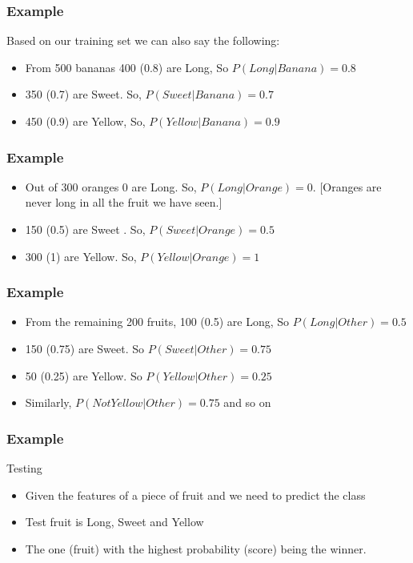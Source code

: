\begin{frame}[fragile]\frametitle{Example}
Based on our training set we can also say the following:
\begin{itemize}
\item From 500 bananas 400 (0.8) are Long, So $P(Long|Banana) = 0.8$
\item 350 (0.7) are Sweet. So, $P(Sweet|Banana) = 0.7$
\item 450 (0.9) are Yellow, So, $P(Yellow|Banana) = 0.9$
\end{itemize}
\end{frame}

\begin{frame}[fragile]\frametitle{Example}
\begin{itemize}
\item Out of 300 oranges 0 are Long. So, $P(Long|Orange) = 0$. [Oranges are never long in all the fruit we have seen.]
\item 150 (0.5) are Sweet . So, $P(Sweet|Orange) = 0.5$
\item 300 (1) are Yellow.  So, $P(Yellow|Orange) = 1$
\end{itemize}
\end{frame}


\begin{frame}[fragile]\frametitle{Example}
\begin{itemize}
\item From the remaining 200 fruits, 100 (0.5) are Long,  So $P(Long|Other) = 0.5$
\item 150 (0.75) are Sweet.  So $P(Sweet|Other) = 0.75$
\item 50 (0.25) are Yellow.  So $P(Yellow|Other) = 0.25$
\item Similarly, $P(Not Yellow|Other) = 0.75$ and so on
\end{itemize}
\end{frame}




\begin{frame}[fragile]\frametitle{Example}
Testing
\begin{itemize}
\item Given the features of a piece of fruit and we need to predict the class
\item Test fruit is Long, Sweet and Yellow
\item The one (fruit) with the highest probability (score) being the winner.
\end{itemize}

\end{frame}


